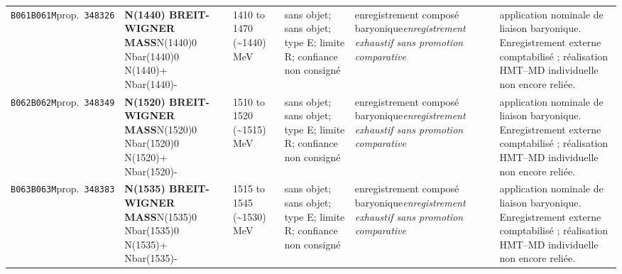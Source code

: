 \begin{landscape}
\begin{longtable}{L{1.85cm}L{4.45cm}L{2.35cm}L{4.05cm}L{3.35cm}L{7.15cm}}
\texttt{B061}\newline \texttt{B061M}\newline prop.\ \texttt{348326} & \textbf{N(1440) BREIT-WIGNER MASS}\newline N(1440)0 \textbar{}\allowbreak{} Nbar(1440)0 \textbar{}\allowbreak{} N(1440)+ \textbar{}\allowbreak{} Nbar(1440)- & 1410 to 1470 (\textasciitilde{}1440)\,MeV & sans objet; sans objet; type E; limite R; confiance non consigné & enregistrement composé baryonique\newline \emph{enregistrement exhaustif sans promotion comparative} & application nominale de liaison baryonique. Enregistrement externe comptabilisé ; réalisation HMT--MD individuelle non encore reliée. \\
\texttt{B062}\newline \texttt{B062M}\newline prop.\ \texttt{348349} & \textbf{N(1520) BREIT-WIGNER MASS}\newline N(1520)0 \textbar{}\allowbreak{} Nbar(1520)0 \textbar{}\allowbreak{} N(1520)+ \textbar{}\allowbreak{} Nbar(1520)- & 1510 to 1520 (\textasciitilde{}1515)\,MeV & sans objet; sans objet; type E; limite R; confiance non consigné & enregistrement composé baryonique\newline \emph{enregistrement exhaustif sans promotion comparative} & application nominale de liaison baryonique. Enregistrement externe comptabilisé ; réalisation HMT--MD individuelle non encore reliée. \\
\texttt{B063}\newline \texttt{B063M}\newline prop.\ \texttt{348383} & \textbf{N(1535) BREIT-WIGNER MASS}\newline N(1535)0 \textbar{}\allowbreak{} Nbar(1535)0 \textbar{}\allowbreak{} N(1535)+ \textbar{}\allowbreak{} Nbar(1535)- & 1515 to 1545 (\textasciitilde{}1530)\,MeV & sans objet; sans objet; type E; limite R; confiance non consigné & enregistrement composé baryonique\newline \emph{enregistrement exhaustif sans promotion comparative} & application nominale de liaison baryonique. Enregistrement externe comptabilisé ; réalisation HMT--MD individuelle non encore reliée. \\

\end{longtable}
\end{landscape}
